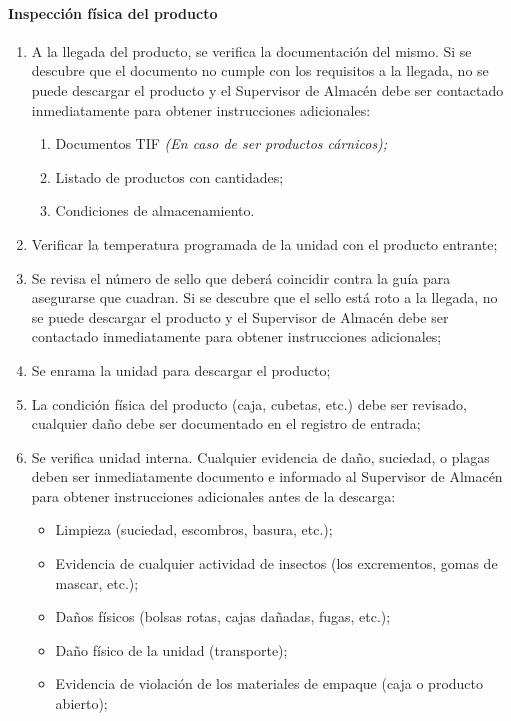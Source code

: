 \paragraph{Inspección física del producto}
\begin{enumerate}
	\item A la llegada del producto, se verifica la documentación del mismo. Si se descubre que el documento no cumple con los requisitos a la llegada, no se puede descargar el producto y el Supervisor de Almacén debe ser contactado inmediatamente para obtener instrucciones adicionales:
	      \begin{enumerate}
		      \item Documentos TIF \emph{(En caso de ser productos cárnicos);}
		      \item Listado de productos con cantidades;
		      \item Condiciones de almacenamiento.
	      \end{enumerate}
	\item Verificar la temperatura programada de la unidad con el producto entrante;
	\item Se revisa el número de sello que deberá coincidir contra la guía para asegurarse que cuadran. Si se descubre que el sello está roto a la llegada, no se puede descargar el producto y el Supervisor de Almacén debe ser contactado inmediatamente para obtener instrucciones adicionales;
	\item Se enrama la unidad para descargar el producto;
	\item La condición física del producto (caja, cubetas, etc.) debe ser revisado, cualquier daño debe ser documentado en el registro de entrada;
	\item Se verifica unidad interna. Cualquier evidencia de daño, suciedad, o plagas deben ser inmediatamente documento e informado al Supervisor de Almacén para obtener instrucciones adicionales antes de la descarga:
	      \begin{itemize}
		      \item Limpieza (suciedad, escombros, basura, etc.);
		      \item Evidencia de cualquier actividad de insectos (los excrementos, gomas de mascar, etc.);
		      \item Daños físicos (bolsas rotas, cajas dañadas, fugas, etc.);
		      \item Daño físico de la unidad (transporte);
		      \item Evidencia de violación de los materiales de empaque (caja o producto abierto);

\end{itemize}
\end{enumerate}
